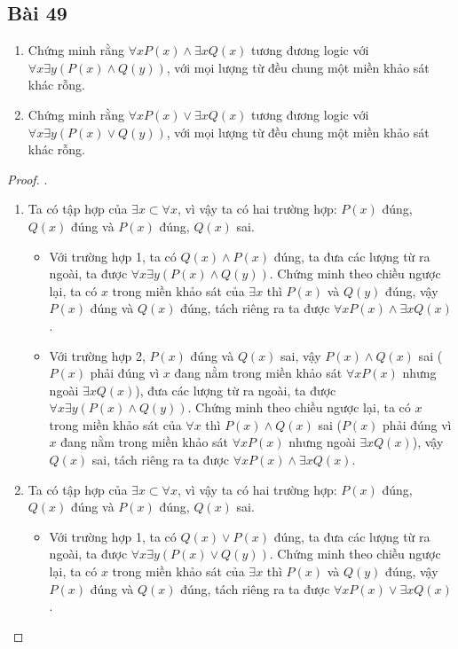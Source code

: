 \subsection*{Bài 49}
\begin{enumerate}[label=\alph*)]
    \item Chứng minh rằng $\forall xP(x)\land\exists xQ(x)$ tương đương logic với $\forall x\exists y(P(x)\land Q(y))$, với mọi lượng từ đều chung một miền khảo sát khác rỗng.
    \item Chứng minh rằng $\forall xP(x)\lor\exists xQ(x)$ tương đương logic với $\forall x\exists y(P(x)\lor Q(y))$, với mọi lượng từ đều chung một miền khảo sát khác rỗng.
\end{enumerate}
\begin{proof}.
    \begin{enumerate}[label=\alph*)]
        \item Ta có tập hợp của $\exists x\subset\forall x$, vì vậy ta có hai trường hợp: $P(x)$ đúng, $Q(x)$ đúng và $P(x)$ đúng, $Q(x)$ sai.
        \begin{itemize}
            \item Với trường hợp 1, ta có $Q(x)\land P(x)$ đúng, ta đưa các lượng từ ra ngoài, ta được $\forall x\exists y(P(x)\land Q(y))$. Chứng minh theo chiều ngược lại, ta có $x$ trong miền khảo sát của $\exists x$ thì $P(x)$ và $Q(y)$ đúng, vậy $P(x)$ đúng và $Q(x)$ đúng, tách riêng ra ta được $\forall xP(x)\land\exists xQ(x)$.
            \item Với trường hợp 2, $P(x)$ đúng và $Q(x)$ sai, vậy $P(x)\land Q(x)$ sai ($P(x)$ phải đúng vì $x$ đang nằm trong miền khảo sát $\forall xP(x)$ nhưng ngoài $\exists xQ(x)$), đưa các lượng từ ra ngoài, ta được $\forall x\exists y(P(x)\land Q(y))$. Chứng minh theo chiều ngược lại, ta có $x$ trong miền khảo sát của $\forall x$ thì $P(x)\land Q(x)$ sai ($P(x)$ phải đúng vì $x$ đang nằm trong miền khảo sát $\forall xP(x)$ nhưng ngoài $\exists xQ(x)$), vậy $Q(x)$ sai, tách riêng ra ta được $\forall xP(x)\land\exists xQ(x)$.
        \end{itemize}
        \item Ta có tập hợp của $\exists x\subset\forall x$, vì vậy ta có hai trường hợp: $P(x)$ đúng, $Q(x)$ đúng và $P(x)$ đúng, $Q(x)$ sai.
        \begin{itemize}
            \item Với trường hợp 1, ta có $Q(x)\lor P(x)$ đúng, ta đưa các lượng từ ra ngoài, ta được $\forall x\exists y(P(x)\lor Q(y))$. Chứng minh theo chiều ngược lại, ta có $x$ trong miền khảo sát của $\exists x$ thì $P(x)$ và $Q(y)$ đúng, vậy $P(x)$ đúng và $Q(x)$ đúng, tách riêng ra ta được $\forall xP(x)\lor\exists xQ(x)$.

\end{itemize}
\end{enumerate}
\end{proof}

